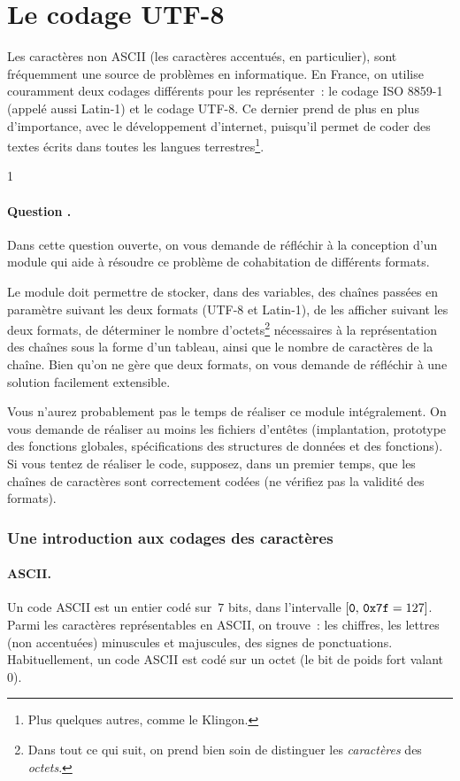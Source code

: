 \documentclass[12pt]{article}
\newcounter{question_counter}
\newcommand{\question}{\addtocounter{question_counter}1 %
    \paragraph{\bf Question \arabic{question_counter}.}}
\newcounter{points_counter}
\newcounter{section_points_counter}
\begin{document}
% 
% 

\section{Le codage UTF-8}

Les caractères non ASCII (les caractères accentués, en particulier), sont
fréquemment une source de problèmes en informatique. En France, on
utilise couramment deux codages différents pour les représenter~: 
le codage ISO 8859-1 (appelé aussi Latin-1) et le codage UTF-8. 
Ce dernier prend de plus en plus d'importance, avec le développement
d'internet, puisqu'il permet de coder des textes écrits dans toutes 
les langues terrestres\footnote{Plus quelques autres, comme le Klingon.}.

\question
Dans cette question ouverte, on vous demande de réfléchir à la
conception d'un module qui aide à résoudre ce problème de cohabitation
de différents formats. 

Le module doit permettre de stocker, dans des variables, des chaînes 
passées en paramètre suivant les deux formats (UTF-8 et Latin-1),
de les afficher suivant les deux formats,
de déterminer le nombre d'octets\footnote{Dans tout ce qui suit, on prend
bien soin de distinguer les {\em caractères} des {\em octets}.} 
nécessaires à la représentation des chaînes sous la forme d'un tableau, 
ainsi que le nombre de caractères de la chaîne.
Bien qu'on ne gère que deux formats, on vous demande de réfléchir à une
solution facilement extensible.

Vous n'aurez probablement pas le temps de réaliser ce module
intégralement. On vous demande de réaliser au moins les fichiers d'entêtes
(implantation, prototype des fonctions globales, spécifications des
structures de données et des fonctions). Si vous tentez de réaliser
le code, supposez, dans un premier temps, que les chaînes de caractères
sont correctement codées (ne vérifiez pas la validité des formats).

\subsubsection*{Une introduction aux codages des caractères}

\paragraph{ASCII.} Un code ASCII est un entier codé sur~$7$ bits, dans
	l'intervalle $[\mbox{\tt 0},\, \mbox{\tt 0x7f} = 127]$. 
Parmi les caractères représentables
en ASCII, on trouve~: les chiffres, les lettres (non accentuées) minuscules
et majuscules, des signes de ponctuations. Habituellement, un code ASCII
est codé sur un octet (le bit de poids fort valant~$0$).
\end{document}
